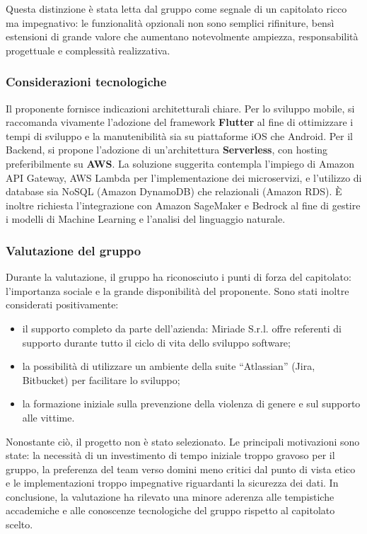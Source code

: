 \documentclass[a4paper,12pt]{article}
\begin{document}
Questa distinzione è stata letta dal gruppo come segnale di un capitolato ricco ma impegnativo: le funzionalità opzionali non sono semplici rifiniture, bensì estensioni di grande valore che aumentano notevolmente ampiezza, responsabilità progettuale e complessità realizzativa.

\subsubsection{Considerazioni tecnologiche}

Il proponente fornisce indicazioni architetturali chiare. Per lo sviluppo mobile, si raccomanda vivamente l'adozione del framework \textbf{Flutter} al fine di ottimizzare i tempi di sviluppo e la manutenibilità sia su piattaforme iOS che Android. Per il Backend, si propone l'adozione di un'architettura \textbf{Serverless}, con hosting preferibilmente su \textbf{AWS}. La soluzione suggerita contempla l'impiego di Amazon API Gateway, AWS Lambda per l'implementazione dei microservizi, e l'utilizzo di database sia NoSQL (Amazon DynamoDB) che relazionali (Amazon RDS). È inoltre richiesta l'integrazione con Amazon SageMaker e Bedrock al fine di gestire i modelli di Machine Learning e l'analisi del linguaggio naturale.

\subsubsection{Valutazione del gruppo}

Durante la valutazione, il gruppo ha riconosciuto i punti di forza del capitolato: l’importanza sociale e la grande disponibilità del proponente. Sono stati inoltre considerati positivamente:
\begin{itemize}
    \item il supporto completo da parte dell’azienda: Miriade S.r.l. offre referenti di supporto durante tutto il ciclo di vita dello sviluppo software;
    \item la possibilità di utilizzare un ambiente della suite ``Atlassian'' (Jira, Bitbucket) per facilitare lo sviluppo;
    \item la formazione iniziale sulla prevenzione della violenza di genere e sul supporto alle vittime.
\end{itemize}

Nonostante ciò, il progetto non è stato selezionato. Le principali motivazioni sono state: la necessità di un investimento di tempo iniziale troppo gravoso per il gruppo, la preferenza del team verso domini meno critici dal punto di vista etico e le implementazioni troppo impegnative riguardanti la sicurezza dei dati. In conclusione, la valutazione ha rilevato una minore aderenza alle tempistiche accademiche e alle conoscenze tecnologiche del gruppo rispetto al capitolato scelto.
\end{document}
